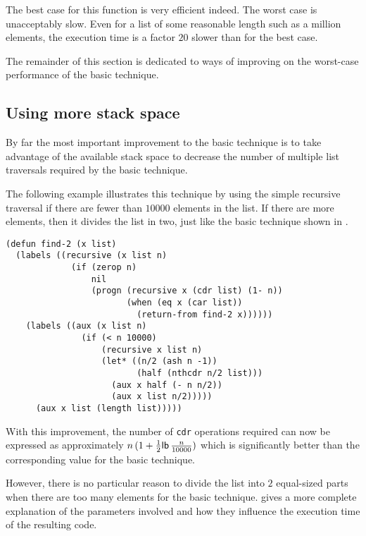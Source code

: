 The best case for this function is very efficient indeed.
The worst case is unacceptably slow.  Even for a list of some
reasonable length such as a million elements, the execution time is a
factor $20$ slower than for the best case.

The remainder of this section is dedicated to ways of improving on the
worst-case performance of the basic technique.

\subsection{Using more stack space}
\label{sec-more-stack}

By far the most important improvement to the basic technique is to
take advantage of the available stack space to decrease the number of
multiple list traversals required by the basic technique.

The following example illustrates this technique by using the simple
recursive traversal if there are fewer than $10000$ elements in the
list.  If there are more elements, then it divides the list in two,
just like the basic technique shown in .

{\small\begin{verbatim}
(defun find-2 (x list)
  (labels ((recursive (x list n)
             (if (zerop n)
                 nil
                 (progn (recursive x (cdr list) (1- n))
                        (when (eq x (car list))
                          (return-from find-2 x))))))
    (labels ((aux (x list n)
               (if (< n 10000)
                   (recursive x list n)
                   (let* ((n/2 (ash n -1))
                          (half (nthcdr n/2 list)))
                     (aux x half (- n n/2))
                     (aux x list n/2)))))
      (aux x list (length list)))))
\end{verbatim}}

With this improvement, the number of \texttt{cdr} operations required
can now be expressed as approximately $n\thinspace (1 +
\frac{1}{2}\mathsf{lb}\thinspace \frac{n}{10000})$
which is significantly better than the corresponding value for the
basic technique.

However, there is no particular reason to divide the list into $2$
equal-sized parts when there are too many elements for the basic
technique.   gives a more complete explanation
of the parameters involved and how they influence the execution time
of the resulting code.

